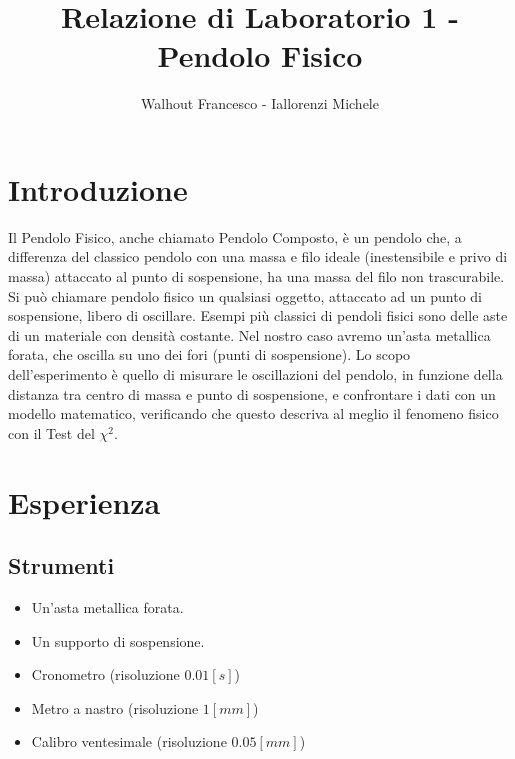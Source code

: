 \documentclass[a4paper]{article}
\title{Relazione di Laboratorio 1 - Pendolo Fisico}
\author{Walhout Francesco - Iallorenzi Michele}
\begin{document}
    \maketitle
    
    \section{Introduzione}
    Il Pendolo Fisico, anche chiamato Pendolo Composto, è un pendolo che, a differenza del classico pendolo con una massa e filo ideale (inestensibile e privo di massa) attaccato al punto di sospensione, ha una massa del filo non trascurabile. Si può chiamare pendolo fisico un qualsiasi oggetto, attaccato ad un punto di sospensione, libero di oscillare. Esempi più classici di pendoli fisici sono delle aste di un materiale con densità costante. Nel nostro caso avremo un'asta metallica forata, che oscilla su uno dei fori (punti di sospensione). Lo scopo dell'esperimento è quello di misurare le oscillazioni del pendolo, in funzione della distanza tra centro di massa e punto di sospensione, e confrontare i dati con un modello matematico, verificando che questo descriva al meglio il fenomeno fisico con il Test del $\chi^2$.
    
    \section{Esperienza}
    
    \subsection{Strumenti}
    \begin{itemize}
        \item Un'asta metallica forata.
        \item Un supporto di sospensione.
        \item Cronometro (risoluzione $0.01 [s]$)
        \item Metro a nastro (risoluzione $1 [mm]$)
        \item Calibro ventesimale (risoluzione $0.05 [mm]$)
    \end{itemize}
    
\end{document}

